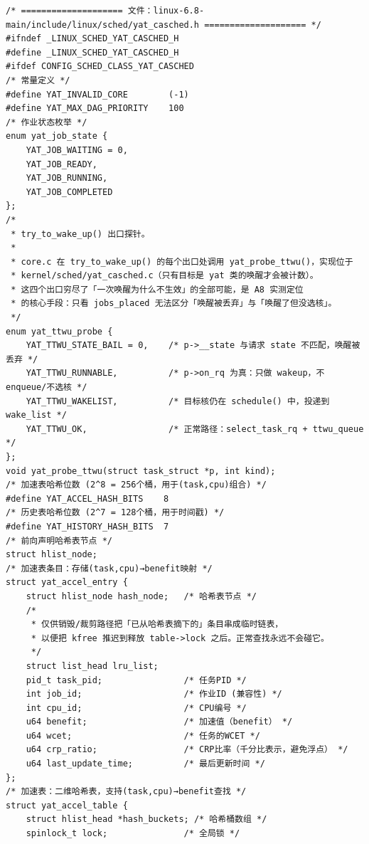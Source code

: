 \documentclass[10pt,a4paper]{article}
\newenvironment{yatpage}{\vspace*{0pt}}{\par}
\begin{document}
\pagestyle{fancy}
\begin{yatpage}
\begin{Verbatim}[fontsize=\fontsize{8.2}{9.8}\selectfont]
/* ==================== 文件：linux-6.8-main/include/linux/sched/yat_casched.h ==================== */
#ifndef _LINUX_SCHED_YAT_CASCHED_H
#define _LINUX_SCHED_YAT_CASCHED_H
#ifdef CONFIG_SCHED_CLASS_YAT_CASCHED
/* 常量定义 */
#define YAT_INVALID_CORE        (-1)
#define YAT_MAX_DAG_PRIORITY    100
/* 作业状态枚举 */
enum yat_job_state {
    YAT_JOB_WAITING = 0,
    YAT_JOB_READY,
    YAT_JOB_RUNNING,
    YAT_JOB_COMPLETED
};
/*
 * try_to_wake_up() 出口探针。
 *
 * core.c 在 try_to_wake_up() 的每个出口处调用 yat_probe_ttwu()，实现位于
 * kernel/sched/yat_casched.c（只有目标是 yat 类的唤醒才会被计数）。
 * 这四个出口穷尽了「一次唤醒为什么不生效」的全部可能，是 A8 实测定位
 * 的核心手段：只看 jobs_placed 无法区分「唤醒被丢弃」与「唤醒了但没选核」。
 */
enum yat_ttwu_probe {
    YAT_TTWU_STATE_BAIL = 0,    /* p->__state 与请求 state 不匹配，唤醒被丢弃 */
    YAT_TTWU_RUNNABLE,          /* p->on_rq 为真：只做 wakeup，不 enqueue/不选核 */
    YAT_TTWU_WAKELIST,          /* 目标核仍在 schedule() 中，投递到 wake_list */
    YAT_TTWU_OK,                /* 正常路径：select_task_rq + ttwu_queue */
};
void yat_probe_ttwu(struct task_struct *p, int kind);
/* 加速表哈希位数 (2^8 = 256个桶，用于(task,cpu)组合) */
#define YAT_ACCEL_HASH_BITS    8
/* 历史表哈希位数 (2^7 = 128个桶，用于时间戳) */
#define YAT_HISTORY_HASH_BITS  7
/* 前向声明哈希表节点 */
struct hlist_node;
/* 加速表条目：存储(task,cpu)→benefit映射 */
struct yat_accel_entry {
    struct hlist_node hash_node;   /* 哈希表节点 */
    /*
     * 仅供销毁/裁剪路径把「已从哈希表摘下的」条目串成临时链表，
     * 以便把 kfree 推迟到释放 table->lock 之后。正常查找永远不会碰它。
     */
    struct list_head lru_list;
    pid_t task_pid;                /* 任务PID */
    int job_id;                    /* 作业ID (兼容性) */
    int cpu_id;                    /* CPU编号 */
    u64 benefit;                   /* 加速值（benefit） */
    u64 wcet;                      /* 任务的WCET */
    u64 crp_ratio;                 /* CRP比率（千分比表示，避免浮点） */
    u64 last_update_time;          /* 最后更新时间 */
};
/* 加速表：二维哈希表，支持(task,cpu)→benefit查找 */
struct yat_accel_table {
    struct hlist_head *hash_buckets; /* 哈希桶数组 */
    spinlock_t lock;               /* 全局锁 */
\end{Verbatim}
\end{yatpage}
\newpage
\end{document}
